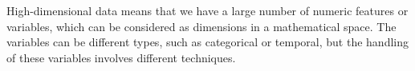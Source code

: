 \documentclass[
  letterpaper,
]{book}
\begin{document}
High-dimensional data means that we have a large number of numeric
features or variables, which can be considered as dimensions in a
mathematical space. The variables can be different types, such as
categorical or temporal, but the handling of these variables involves
different techniques.

\begin{figure}

\begin{minipage}[t]{0.33\linewidth}

{\centering 


}

\end{minipage}%
%
\begin{minipage}[t]{0.33\linewidth}

{\centering 

}
\end{minipage}
\end{figure}
\end{document}

